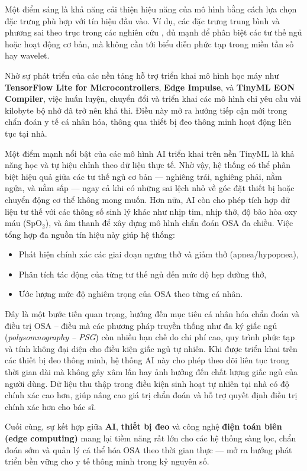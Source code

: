 Một điểm sáng là khả năng cải thiện hiệu năng của mô hình bằng cách lựa chọn
đặc trưng phù hợp với tín hiệu đầu vào. Ví dụ, các đặc trưng trung bình và
phương sai theo trục trong các nghiên cứu \cite{gomes2021}, \cite{souza2017} đủ
mạnh để phân biệt các tư thế ngủ hoặc hoạt động cơ bản, mà không cần tới biểu
diễn phức tạp trong miền tần số hay wavelet.

Nhờ sự phát triển của các nền tảng hỗ trợ triển khai mô hình học máy như
\textbf{TensorFlow Lite for Microcontrollers}, \textbf{Edge Impulse}, và
\textbf{TinyML EON Compiler}, việc huấn luyện, chuyển đổi và triển khai các mô
hình chỉ yêu cầu vài kilobyte bộ nhớ đã trở nên khả thi. Điều này mở ra hướng
tiếp cận mới trong chẩn đoán y tế cá nhân hóa, thông qua thiết bị đeo thông
minh hoạt động liên tục tại nhà.

Một điểm mạnh nổi bật của các mô hình AI triển khai trên nền TinyML là khả năng
học và tự hiệu chỉnh theo dữ liệu thực tế. Nhờ vậy, hệ thống có thể phân biệt
hiệu quả giữa các tư thế ngủ cơ bản — nghiêng trái, nghiêng phải, nằm ngửa, và
nằm sấp — ngay cả khi có những sai lệch nhỏ về góc đặt thiết bị hoặc chuyển
động cơ thể không mong muốn. Hơn nữa, AI còn cho phép tích hợp dữ liệu tư thế
với các thông số sinh lý khác như nhịp tim, nhịp thở, độ bão hòa oxy máu
(SpO$_2$), và âm thanh để xây dựng mô hình chẩn đoán OSA đa chiều. Việc tổng
hợp đa nguồn tín hiệu này giúp hệ thống:
\begin{itemize}
  \item Phát hiện chính xác các giai đoạn ngưng thở và giảm thở (apnea/hypopnea),
  \item Phân tích tác động của từng tư thế ngủ đến mức độ hẹp đường thở,
  \item Ước lượng mức độ nghiêm trọng của OSA theo từng cá nhân.
\end{itemize}
Đây là một bước tiến quan trọng, hướng đến mục tiêu cá nhân hóa chẩn đoán và điều trị OSA – điều mà các phương pháp truyền thống như đa ký giấc ngủ (\textit{polysomnography – PSG}) còn nhiều hạn chế do chi phí cao, quy trình phức tạp và tính không đại diện cho điều kiện giấc ngủ tự nhiên.
Khi được triển khai trên các thiết bị đeo thông minh, hệ thống AI này cho phép theo dõi liên tục trong thời gian dài mà không gây xâm lấn hay ảnh hưởng đến chất lượng giấc ngủ của người dùng. Dữ liệu thu thập trong điều kiện sinh hoạt tự nhiên tại nhà có độ chính xác cao hơn, giúp nâng cao giá trị chẩn đoán và hỗ trợ quyết định điều trị chính xác hơn cho bác sĩ.

Cuối cùng, sự kết hợp giữa \textbf{AI}, \textbf{thiết bị đeo} và công nghệ
\textbf{điện toán biên (edge computing)} mang lại tiềm năng rất lớn cho các hệ
thống sàng lọc, chẩn đoán sớm và quản lý cá thể hóa OSA theo thời gian thực —
mở ra hướng phát triển bền vững cho y tế thông minh trong kỷ nguyên số.


